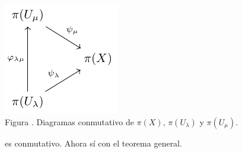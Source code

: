 \documentclass[12pt]{report}
\theoremstyle{largebreak}
\newcounter{figcount}
\begin{document}
    \begin{minipage}{\textwidth}
        \begin{center}
            \includegraphics[scale=1.5]{images/fig_3.pdf}\\
            Figura \thefigcount. Diagramas conmutativo de $\pi(X)$, $\pi(U_\lambda)$ y $\pi(U_\mu)$.
        \end{center}
    \end{minipage}

    es conmutativo. Ahora sí con el teorema general.
\end{document}
